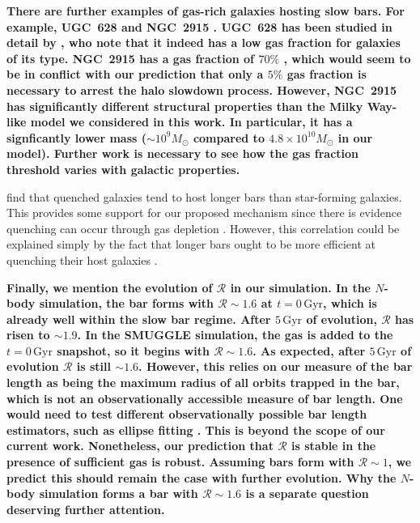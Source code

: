 \documentclass[twocolumn,linenumbers,trackchanges]{aastex631}
\newcommand{\Rot}{\ensuremath{\mathcal{R}}}
\newcommand{\Msun}{\ensuremath{M_{\odot}}}
\begin{document}
{\bf There are further examples of gas-rich galaxies hosting slow bars. For
example, UGC~628 \citep[$\Rot\sim2$;][]{2009AA...499L..25C} and NGC~2915
\citep[$\Rot>1.7$;][]{1999AJ....118.2158B}. UGC~628
has been studied in detail by \citet{2016MNRAS.463.1751C}, who note that it
indeed has a low gas fraction for galaxies of its type. NGC~2915 has a gas
fraction of $70\%$ \citep{2010ApJ...715..656W}, which would seem to be in
conflict with our prediction that only a $5\%$ gas fraction is necessary to
arrest the halo slowdown process. However, NGC~2915 has significantly different
structural properties than the Milky Way-like model we considered in this work.
In particular, it has a signficantly lower mass ($\sim10^9\Msun$ compared to
$4.8\times10^{10}\Msun$ in our model). Further work is necessary to see how the
gas fraction threshold varies with galactic properties.}

\citet{2020MNRAS.495.4158F} find that quenched galaxies tend to host longer bars
than star-forming galaxies. This provides some support for our proposed
mechanism since there is evidence quenching can occur through gas depletion
\citep[e.g.][]{2021Natur.597..485W}. However, this correlation could be
explained simply by the fact that longer bars ought to be more efficient at
quenching their host galaxies \citep[e.g][]{2015AA...580A.116G}.

{\bf Finally, we mention the evolution of \Rot{} in our simulation. In the
$N$-body simulation, the bar forms with $\Rot\sim1.6$ at $t=0\,\textrm{Gyr}$,
which is already well within the slow bar regime. After $5\,\textrm{Gyr}$ of
evolution, \Rot{} has risen to $\sim1.9$. In the SMUGGLE simulation, the gas is
added to the $t=0\,\textrm{Gyr}$ snapshot, so it begins with $\Rot{}\sim1.6$. As
expected, after $5\,\textrm{Gyr}$ of evolution \Rot{} is still $\sim1.6$.
However, this relies on our measure of the bar length as being the maximum
radius of all orbits trapped in the bar, which is not an observationally
accessible measure of bar length. One would need to test different
observationally possible bar length estimators, such as ellipse fitting
\citep{1990MNRAS.245..130A, 1999AAS..140....1M, 2002MNRAS.330...35A,
2006AA...452...97M, 2009AA...495..491A, 2015AA...576A.102A}. This is beyond the
scope of our current work. Nonetheless, our prediction that \Rot{} is stable in
the presence of sufficient gas is robust. Assuming bars form with $\Rot\sim1$,
we predict this should remain the case with further evolution. Why the $N$-body
simulation forms a bar with $\Rot\sim1.6$ is a separate question deserving
further attention.}
\end{document}
